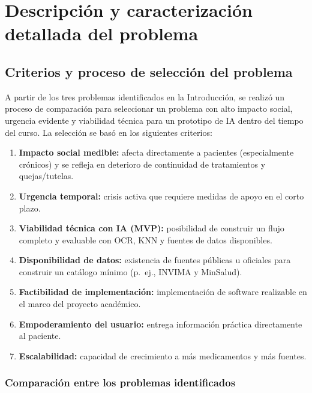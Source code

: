 \section{Descripción y caracterización detallada del problema}

\subsection{Criterios y proceso de selección del problema}

A partir de los tres problemas identificados en la Introducción, se realizó un proceso de comparación para seleccionar un problema con alto impacto social, urgencia evidente y viabilidad técnica para un prototipo de IA dentro del tiempo del curso. La selección se basó en los siguientes criterios:

\begin{enumerate}
	\item \textbf{Impacto social medible:} afecta directamente a pacientes (especialmente crónicos) y se refleja en deterioro de continuidad de tratamientos y quejas/tutelas.
	\item \textbf{Urgencia temporal:} crisis activa que requiere medidas de apoyo en el corto plazo.
	\item \textbf{Viabilidad técnica con IA (MVP):} posibilidad de construir un flujo completo y evaluable con OCR, KNN y fuentes de datos disponibles.
	\item \textbf{Disponibilidad de datos:} existencia de fuentes públicas u oficiales para construir un catálogo mínimo (p.\ ej., INVIMA y MinSalud).
	\item \textbf{Factibilidad de implementación:} implementación de software realizable en el marco del proyecto académico.
	\item \textbf{Empoderamiento del usuario:} entrega información práctica directamente al paciente.
	\item \textbf{Escalabilidad:} capacidad de crecimiento a más medicamentos y más fuentes.
\end{enumerate}

\subsubsection{Comparación entre los problemas identificados}

